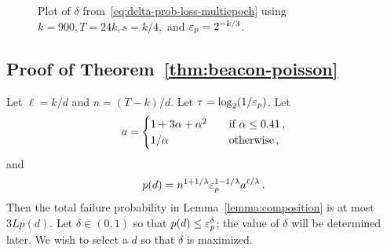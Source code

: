 \begin{figure}
  \caption{Plot of $\delta$ from~\eqref{eq:delta-prob-loss-multiepoch} using $k = 900, T = 24k, s = k/4,$ and $\mathsf{\varepsilon}_p = 2^{-k/3}$.}
  \label{fig:poisson-beacon}
\end{figure}




\newcommand{\dMin}{d_\mathrm{min}}
\newcommand{\dMax}{d_\mathrm{max}}

\subsection{Proof of Theorem~\ref{thm:beacon-poisson}}

	Let $\ell = k/d$ and $n = (T - k)/d$. 
	Let $\tau = \log_2(1/\mathsf{\varepsilon}_p)$. 
	Let 
	$$
    a = \begin{cases}
        1 + 3 \alpha + \alpha^2 &\quad\text{if $\alpha \leq 0.41$\,,} \\
        1/\alpha &\quad\text{otherwise\,,}
    \end{cases}
	$$
	and 
	$$
		p(d) = n^{1+1/\lambda} \mathsf{\varepsilon}_p^{1 - 1/\lambda} a^{\ell/\lambda}
		\,.
	$$
	Then the total failure probability in Lemma~\ref{lemma:composition} is at most $3 L p(d)$.	
	Let $\delta \in (0, 1)$ so that $p(d) \leq \mathsf{\varepsilon}_p^\delta$; 
	the value of $\delta$ will be determined later. 
	We wish to select a $d$ so that $\delta$ is maximized.

